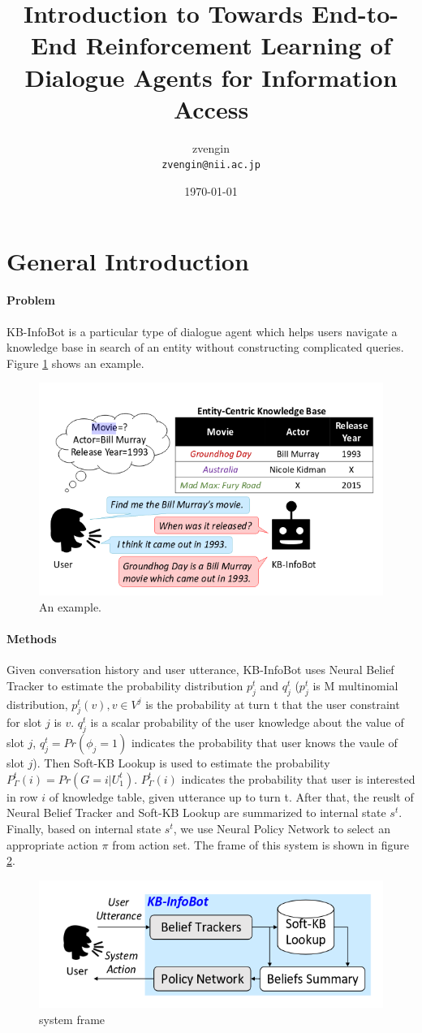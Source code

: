 \documentclass[11pt]{article}
\title{\textbf{Introduction to Towards End-to-End Reinforcement Learning of Dialogue Agents for Information Access}}
\author{zvengin\\
\texttt{zvengin@nii.ac.jp}
}
\date{\today}
\begin{document}
\maketitle
\section{General Introduction}
\paragraph{Problem}
KB-InfoBot is a particular type of dialogue agent which helps users navigate a knowledge base in search of an entity without constructing complicated queries.
Figure \ref{fig:example} shows an example.
\begin{figure}
  \centering 
  \includegraphics[width=0.5\linewidth]{pic/example.png}
  \caption{An example.}
  \label{fig:example}
\end{figure}
\paragraph{Methods}
Given conversation history and user utterance, KB-InfoBot uses Neural Belief Tracker to estimate the probability distribution $p^t_j$ and $q^t_j$ ($p^t_j$ is M multinomial distribution, $p^t_j(v), v\in V^j$ is the probability at turn t that the user constraint for slot $j$ is $v$. $q^t_j $ is a scalar probability of the user knowledge about the value of slot $j$, $q^t_j=Pr(\phi_j=1)$ indicates the probability that user knows the vaule of slot $j$). Then Soft-KB Lookup is used to estimate the probability $P^t_{\Gamma}(i)=Pr(G=i\vert U^t_1)$. $P^t_{\Gamma}(i)$ indicates the probability that user is interested in row $i$ of knowledge table, given utterance up to turn t. After that, the reuslt of Neural Belief Tracker and Soft-KB Lookup are summarized to internal state $s^t$. Finally, based on internal state $s^t$, we use Neural Policy Network to select an appropriate action $\pi$ from action set. The frame of this system is shown in figure \ref{fig:frame}.

\begin{figure}
   \centering
   \includegraphics[width=0.5\linewidth]{pic/frame.png}
   \caption{system frame}
   \label{fig:frame}
\end{figure}
\end{document}
